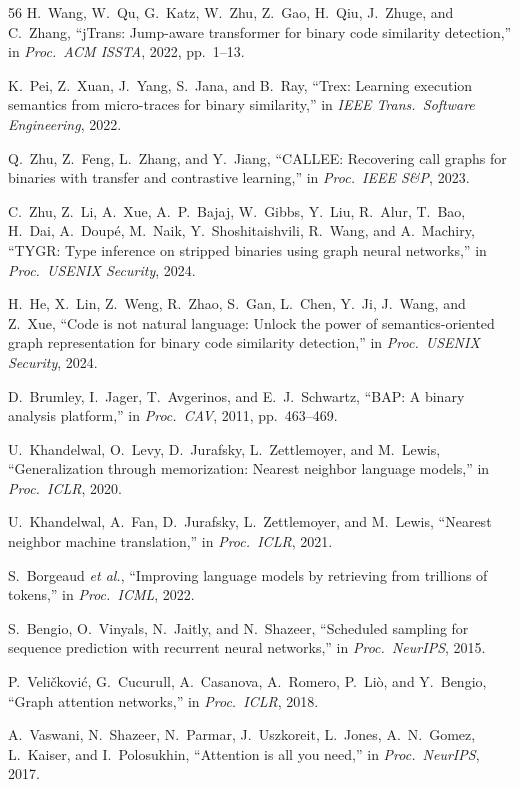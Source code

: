 \documentclass[sigconf,nonacm]{acmart}
\begin{document}
{\begin{thebibliography}{56}
H.~Wang, W.~Qu, G.~Katz, W.~Zhu, Z.~Gao, H.~Qiu, J.~Zhuge, and C.~Zhang, ``jTrans: Jump-aware transformer for binary code similarity detection,'' in \emph{Proc.\ ACM ISSTA}, 2022, pp.~1--13.

K.~Pei, Z.~Xuan, J.~Yang, S.~Jana, and B.~Ray, ``Trex: Learning execution semantics from micro-traces for binary similarity,'' in \emph{IEEE Trans.\ Software Engineering}, 2022.

Q.~Zhu, Z.~Feng, L.~Zhang, and Y.~Jiang, ``CALLEE: Recovering call graphs for binaries with transfer and contrastive learning,'' in \emph{Proc.\ IEEE S\&P}, 2023.

C.~Zhu, Z.~Li, A.~Xue, A.~P.~Bajaj, W.~Gibbs, Y.~Liu, R.~Alur, T.~Bao, H.~Dai, A.~Doup\'{e}, M.~Naik, Y.~Shoshitaishvili, R.~Wang, and A.~Machiry, ``TYGR: Type inference on stripped binaries using graph neural networks,'' in \emph{Proc.\ USENIX Security}, 2024.

H.~He, X.~Lin, Z.~Weng, R.~Zhao, S.~Gan, L.~Chen, Y.~Ji, J.~Wang, and Z.~Xue, ``Code is not natural language: Unlock the power of semantics-oriented graph representation for binary code similarity detection,'' in \emph{Proc.\ USENIX Security}, 2024.

D.~Brumley, I.~Jager, T.~Avgerinos, and E.~J.~Schwartz, ``BAP: A binary analysis platform,'' in \emph{Proc.\ CAV}, 2011, pp.~463--469.

U.~Khandelwal, O.~Levy, D.~Jurafsky, L.~Zettlemoyer, and M.~Lewis, ``Generalization through memorization: Nearest neighbor language models,'' in \emph{Proc.\ ICLR}, 2020.

U.~Khandelwal, A.~Fan, D.~Jurafsky, L.~Zettlemoyer, and M.~Lewis, ``Nearest neighbor machine translation,'' in \emph{Proc.\ ICLR}, 2021.

S.~Borgeaud \emph{et al.}, ``Improving language models by retrieving from trillions of tokens,'' in \emph{Proc.\ ICML}, 2022.

S.~Bengio, O.~Vinyals, N.~Jaitly, and N.~Shazeer, ``Scheduled sampling for sequence prediction with recurrent neural networks,'' in \emph{Proc.\ NeurIPS}, 2015.

P.~Veli\v{c}kovi\'{c}, G.~Cucurull, A.~Casanova, A.~Romero, P.~Li\`{o}, and Y.~Bengio, ``Graph attention networks,'' in \emph{Proc.\ ICLR}, 2018.

A.~Vaswani, N.~Shazeer, N.~Parmar, J.~Uszkoreit, L.~Jones, A.~N.~Gomez, L.~Kaiser, and I.~Polosukhin, ``Attention is all you need,'' in \emph{Proc.\ NeurIPS}, 2017.


\end{thebibliography}}
\end{document}
